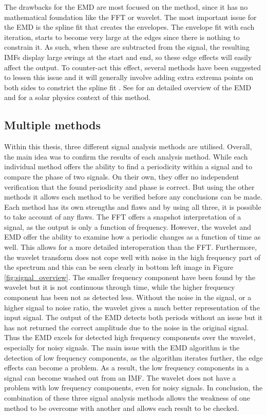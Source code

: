     The drawbacks for the EMD are most focused on the method, since it has no mathematical foundation like the FFT or wavelet.
    The most important issue for the EMD is the spline fit that creates the envelopes.
    The envelope fit with each iteration, starts to become very large at the edges since there is nothing to constrain it.
    As such, when these are subtracted from the signal, the resulting IMFs display large swings at the start and end, so these edge effects will easily affect the output.
    To counter-act this effect, several methods have been suggested to lessen this issue and it will generally involve adding extra extrema points on both sides to constrict the spline fit \citep{zeng2004simple}.
    See \cite{huang} for an detailed overview of the EMD and  \cite{terradas} for a solar physics context of this method.

\subsection{Multiple methods}    

    Within this thesis, three different signal analysis methods are utilised.
    Overall, the main idea was to confirm the results of each analysis method.
    While each individual method offers the ability to find a periodicity within a signal and to compare the phase of two signals. 
    On their own, they offer no independent verification that the found periodicity and phase is correct. 
    But using the other methods it allows each method to be verified before any conclusions can be made.
    Each method has its own strengths and flaws and by using all three, it is possible to take account of any flaws.
    The FFT offers a snapshot interpretation of a signal, as the output is only a function of frequency. 
    However, the wavelet and EMD offer the ability to examine how a periodic changes as a function of time as well.
    This allows for a more detailed interoperation than the FFT.  
    Furthermore, the wavelet transform does not cope well with noise in the high frequency part of the spectrum and this can be seen clearly in bottom left image in Figure \ref{fig:signal_overview}.
    The smaller frequency component have been found by the wavelet but it is not continuous through time, while the higher frequency component has been not as detected less.
    Without the noise in the signal, or a higher signal to noise ratio, the wavelet gives a much better representation of the input signal. 
    The output of the EMD detects both periods without an issue but it has not returned the correct amplitude due to the noise in the original signal. 
    Thus the EMD excels for detected high frequency components over the wavelet, especially for noisy signals.
    The main issue with the EMD algorithm is the detection of low frequency components, as the algorithm iterates further, the edge effects can become a problem.
    As a result, the low frequency components in a signal can become washed out from an IMF. 
    The wavelet does not have a problem with low frequency components, even for noisy signals. 
    In conclusion, the combination of these three signal analysis methods allows the weakness of one method to be overcome with another and allows each result to be checked.
  
